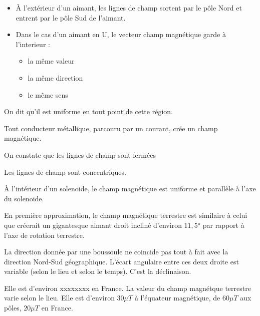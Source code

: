 \begin{itemize}
\item \`A l'ext\'erieur d'un aimant, les lignes de champ sortent par le p\^ole Nord et entrent par le p\^ole Sud de l'aimant. 
\item Dans le cas d'un aimant en U, le vecteur champ magn\'etique garde \`a l'interieur :
 \begin{itemize}
  \item la m\^eme valeur
  \item la m\^eme direction
  \item le m\^eme sens
 \end{itemize}
\end{itemize}

On dit qu'il est uniforme en tout point de cette r\'egion.




Tout conducteur m\'etallique, parcouru par un courant, cr\'ee un champ magn\'etique.



On constate que les lignes de champ sont ferm\'ees


Les lignes de champ sont concentriques.



\`A l'int\'erieur d'un solenoide, le champ magn\'etique est uniforme et parall\`ele \`a l'axe du solenoide.



En premi\`ere approximation, le champ magn\'etique terrestre est similaire \`a celui que cr\'eerait un gigantesque aimant droit inclin\'e d'environ $11,5°$ par rapport \`a l'axe de rotation terrestre.


La direction donn\'ee par une boussoule ne coincide pas tout \`a fait avec la direction Nord-Sud g\'eographique. L'\'ecart angulaire entre ces deux droite est variable (selon le lieu et selon le temps). C'est la d\'eclinaison.



Elle est d'environ xxxxxxxx en France. La valeur du champ magn\'etque terrestre varie selon le lieu. Elle est d'environ $30 \mu T$ \`a l'\'equateur magn\'etique, de $60 \mu T$ aux p\^oles, $20 \mu T$ en France.




